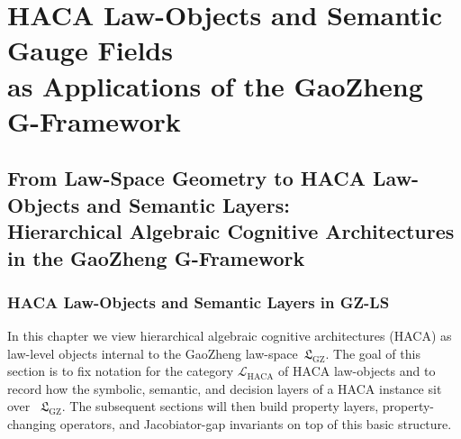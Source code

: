\documentclass[11pt]{book}
\theoremstyle{plain}
\theoremstyle{definition}
\theoremstyle{remark}
\newcommand{\GZLS}{\ensuremath{\mathfrak{L}_{\mathrm{GZ}}}}       \newcommand{\GZLT}{\ensuremath{M_{!w}}}                           \newcommand{\GZLOC}{\ensuremath{A_M}}                             \newcommand{\GZLC}{\ensuremath{\omega_{\mathrm{law}}}}            \newcommand{\GZLCurv}{\ensuremath{\mathcal{F}_{\mathrm{law}}}}
\begin{document}
\mainmatter



\part[HACA Law-Objects and Semantic Gauge Fields]{HACA Law-Objects and Semantic Gauge Fields\\
      as Applications of the GaoZheng G-Framework}

\chapter[From Law-Space Geometry to HACA Law-Objects and Semantic Layers]{From Law-Space Geometry to HACA Law-Objects and Semantic Layers:\\
         Hierarchical Algebraic Cognitive Architectures in the GaoZheng G-Framework}


\section[HACA Law-Objects and Semantic Layers in GZ-LS]{HACA Law-Objects and Semantic Layers in GZ-LS}


In this chapter we view hierarchical algebraic cognitive architectures
(HACA) as law-level objects internal to the GaoZheng law-space~\GZLS.
The goal of this section is to fix notation for the category
$\mathcal{L}_{\mathrm{HACA}}$ of HACA law-objects and to record how the
symbolic, semantic, and decision layers of a HACA instance sit over
~\GZLS. The subsequent sections will then build property layers,
property-changing operators, and Jacobiator-gap invariants on top of
this basic structure.
\end{document}
